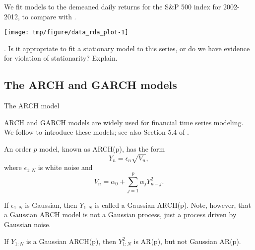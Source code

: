 \begin{frame}[fragile]




\bi

\item We fit models to the demeaned daily returns for the S\&P 500 index for 2002-2012, to compare with \citet{breto14}. 

\ei



\begin{knitrout}\small
{}\color{fgcolor}

{\centering \texttt{[image: tmp/figure/data\_rda\_plot-1]} 

}


\end{knitrout}

\myquestion. Is it appropriate to fit a stationary model to this series, or do we have evidence for violation of stationarity? Explain.


\end{frame}

\subsection{The ARCH and GARCH models}

\begin{frame}[fragile]{The ARCH model}

\bi

\item ARCH and GARCH models are widely used for financial time series modeling. We follow \citet{cowpertwait09} to introduce these models; see also Section 5.4 of \citep{shumway17}.

\item An order $p$  model, known as ARCH(p), has the form
$$ Y_n = \epsilon_n \sqrt{V_n},$$
where $\epsilon_{1:N}$ is white noise and
$$ V_n = \alpha_0 + \sum_{j=1}^p \alpha_j Y_{n-j}^2.$$

\item If $\epsilon_{1:N}$ is Gaussian, then $Y_{1:N}$ is called a Gaussian ARCH(p). Note, however, that a Gaussian ARCH model is not a Gaussian process, just a process driven by Gaussian noise.

\item If  $Y_{1:N}$ is a Gaussian ARCH(p), then  $Y_{1:N}^2$ is AR(p), but not Gaussian AR(p).

\ei

\end{frame}

